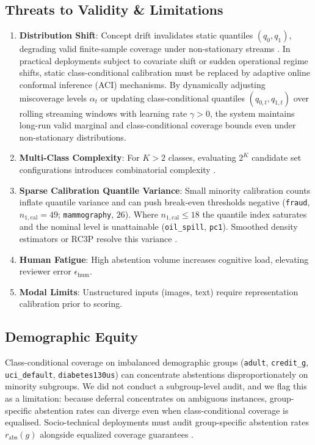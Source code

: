 \documentclass{ieeetj}
\begin{document}
\subsection{Threats to Validity \& Limitations}
\begin{enumerate}
    \item \textbf{Distribution Shift}: Concept drift invalidates static quantiles $(q_0, q_1)$, degrading valid finite-sample coverage under non-stationary streams \cite{barber2023conformal, tibshirani2019covariate, gibbs2021adaptive}. In practical deployments subject to covariate shift or sudden operational regime shifts, static class-conditional calibration must be replaced by adaptive online conformal inference (ACI) mechanisms. By dynamically adjusting miscoverage levels $\alpha_t$ or updating class-conditional quantiles $(q_{0,t}, q_{1,t})$ over rolling streaming windows with learning rate $\gamma > 0$, the system maintains long-run valid marginal and class-conditional coverage bounds even under non-stationary distributions.
    \item \textbf{Multi-Class Complexity}: For $K > 2$ classes, evaluating $2^K$ candidate set configurations introduces combinatorial complexity \cite{cauchois2021knowing}.
    \item \textbf{Sparse Calibration Quantile Variance}: Small minority calibration counts inflate quantile variance and can push break-even thresholds negative (\texttt{fraud}, $n_{1,\mathrm{cal}}=49$; \texttt{mammography}, $26$). Where $n_{1,\mathrm{cal}} \le 18$ the quantile index saturates and the nominal level is unattainable (\texttt{oil\_spill}, \texttt{pc1}). Smoothed density estimators or RC3P resolve this variance \cite{ding2023class, shi2024rc3p}.
    \item \textbf{Human Fatigue}: High abstention volume increases cognitive load, elevating reviewer error $\epsilon_{\mathrm{hum}}$.
    \item \textbf{Modal Limits}: Unstructured inputs (images, text) require representation calibration prior to scoring.
\end{enumerate}

\subsection{Demographic Equity}
Class-conditional coverage on imbalanced demographic groups (\texttt{adult}, \texttt{credit\_g}, \texttt{uci\_default}, \texttt{diabetes130us}) can concentrate abstentions disproportionately on minority subgroups. We did not conduct a subgroup-level audit, and we flag this as a limitation: because deferral concentrates on ambiguous instances, group-specific abstention rates can diverge even when class-conditional coverage is equalised. Socio-technical deployments must audit group-specific abstention rates $r_{\mathrm{abs}}(g)$ alongside equalized coverage guarantees \cite{romano2020equalized}.
\end{document}
